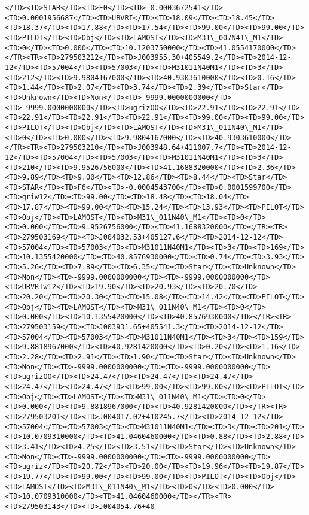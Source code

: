 \documentclass[11pt]{article}
\begin{document}
\begin{Verbatim}[commandchars=\\\{\}]
</TD><TD>STAR</TD><TD>F0</TD><TD>-0.0003672541</TD><TD>0.0001956687</TD><TD>UBVRI</TD><TD>18.09</TD><TD>18.45</TD><TD>18.37</TD><TD>17.88</TD><TD>17.54</TD><TD>99.00</TD><TD>99.00</TD><TD>PILOT</TD><TD>Obj</TD><TD>LAMOST</TD><TD>M31\_007N41\_M1</TD><TD>0</TD><TD>0.000</TD><TD>10.1203750000</TD><TD>41.0554170000</TD></TR><TR><TD>279503212</TD><TD>J003955.30+405549.2</TD><TD>2014-12-12</TD><TD>57004</TD><TD>57003</TD><TD>M31011N40M1</TD><TD>3</TD><TD>212</TD><TD>9.9804167000</TD><TD>40.9303610000</TD><TD>0.16</TD><TD>1.44</TD><TD>2.07</TD><TD>3.74</TD><TD>2.39</TD><TD>Star</TD><TD>Unknown</TD><TD>Non</TD><TD>-9999.0000000000</TD><TD>-9999.0000000000</TD><TD>ugrizOO</TD><TD>22.91</TD><TD>22.91</TD><TD>22.91</TD><TD>22.91</TD><TD>22.91</TD><TD>99.00</TD><TD>99.00</TD><TD>PILOT</TD><TD>Obj</TD><TD>LAMOST</TD><TD>M31\_011N40\_M1</TD><TD>0</TD><TD>0.000</TD><TD>9.9804167000</TD><TD>40.9303610000</TD></TR><TR><TD>279503210</TD><TD>J003948.64+411007.7</TD><TD>2014-12-12</TD><TD>57004</TD><TD>57003</TD><TD>M31011N40M1</TD><TD>3</TD><TD>210</TD><TD>9.9526756000</TD><TD>41.1688320000</TD><TD>2.36</TD><TD>9.89</TD><TD>9.00</TD><TD>12.86</TD><TD>8.44</TD><TD>Star</TD><TD>STAR</TD><TD>F6</TD><TD>-0.0004543700</TD><TD>0.0001599700</TD><TD>griw12</TD><TD>99.00</TD><TD>18.48</TD><TD>18.04</TD><TD>17.87</TD><TD>99.00</TD><TD>15.24</TD><TD>13.93</TD><TD>PILOT</TD><TD>Obj</TD><TD>LAMOST</TD><TD>M31\_011N40\_M1</TD><TD>0</TD><TD>0.000</TD><TD>9.9526756000</TD><TD>41.1688320000</TD></TR><TR><TD>279503169</TD><TD>J004032.53+405127.6</TD><TD>2014-12-12</TD><TD>57004</TD><TD>57003</TD><TD>M31011N40M1</TD><TD>3</TD><TD>169</TD><TD>10.1355420000</TD><TD>40.8576930000</TD><TD>0.74</TD><TD>3.93</TD><TD>5.26</TD><TD>7.89</TD><TD>6.35</TD><TD>Star</TD><TD>Unknown</TD><TD>Non</TD><TD>-9999.0000000000</TD><TD>-9999.0000000000</TD><TD>UBVRIw12</TD><TD>19.90</TD><TD>20.93</TD><TD>20.70</TD><TD>20.20</TD><TD>20.30</TD><TD>15.08</TD><TD>14.42</TD><TD>PILOT</TD><TD>Obj</TD><TD>LAMOST</TD><TD>M31\_011N40\_M1</TD><TD>0</TD><TD>0.000</TD><TD>10.1355420000</TD><TD>40.8576930000</TD></TR><TR><TD>279503159</TD><TD>J003931.65+405541.3</TD><TD>2014-12-12</TD><TD>57004</TD><TD>57003</TD><TD>M31011N40M1</TD><TD>3</TD><TD>159</TD><TD>9.8818967000</TD><TD>40.9281420000</TD><TD>0.20</TD><TD>1.16</TD><TD>2.28</TD><TD>2.91</TD><TD>1.90</TD><TD>Star</TD><TD>Unknown</TD><TD>Non</TD><TD>-9999.0000000000</TD><TD>-9999.0000000000</TD><TD>ugrizOO</TD><TD>24.47</TD><TD>24.47</TD><TD>24.47</TD><TD>24.47</TD><TD>24.47</TD><TD>99.00</TD><TD>99.00</TD><TD>PILOT</TD><TD>Obj</TD><TD>LAMOST</TD><TD>M31\_011N40\_M1</TD><TD>0</TD><TD>0.000</TD><TD>9.8818967000</TD><TD>40.9281420000</TD></TR><TR><TD>279503201</TD><TD>J004017.02+410245.7</TD><TD>2014-12-12</TD><TD>57004</TD><TD>57003</TD><TD>M31011N40M1</TD><TD>3</TD><TD>201</TD><TD>10.0709310000</TD><TD>41.0460460000</TD><TD>0.88</TD><TD>2.88</TD><TD>3.41</TD><TD>4.25</TD><TD>3.51</TD><TD>Star</TD><TD>Unknown</TD><TD>Non</TD><TD>-9999.0000000000</TD><TD>-9999.0000000000</TD><TD>ugriz</TD><TD>20.72</TD><TD>20.00</TD><TD>19.96</TD><TD>19.87</TD><TD>19.77</TD><TD>99.00</TD><TD>99.00</TD><TD>PILOT</TD><TD>Obj</TD><TD>LAMOST</TD><TD>M31\_011N40\_M1</TD><TD>0</TD><TD>0.000</TD><TD>10.0709310000</TD><TD>41.0460460000</TD></TR><TR><TD>279503143</TD><TD>J004054.76+40
\end{Verbatim}
\end{document}
